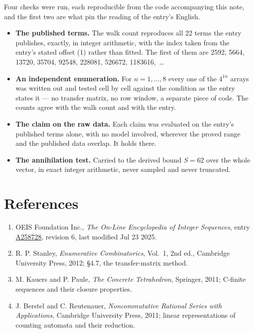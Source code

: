 \documentclass[11pt]{article}
\theoremstyle{definition}
\begin{document}
Four checks were run, each reproducible from the code accompanying this note, and the first two are what pin the reading of the entry's English.

\begin{itemize}

\item {\bfseries The published terms.} The walk count reproduces all 22 terms the entry publishes, exactly, in integer arithmetic, with the index taken from the entry's stated offset (1) rather than fitted. The first of them are 2592, 5664, 13720, 35704, 92548, 228081, 526672, 1183616,~\dots

\item {\bfseries An independent enumeration.} For $n = 1,\dots,8$ every one of the $4^{1n}$ arrays was written out and tested cell by cell against the condition as the entry states it --- no transfer matrix, no row window, a separate piece of code. The counts agree with the walk count and with the entry.

\item {\bfseries The claim on the raw data.} Each claim was evaluated on the entry's published terms alone, with no model involved, wherever the proved range and the published data overlap. It holds there.

\item {\bfseries The annihilation test.} Carried to the derived bound $S = 62$ over the whole vector, in exact integer arithmetic, never sampled and never truncated.

\end{itemize}

\section{References}

\begin{enumerate}

\item OEIS Foundation Inc., \emph{The On-Line Encyclopedia of Integer Sequences}, entry \href{https://oeis.org/A258728}{A258728}, revision 6, last modified Jul 23 2025.

\item R. P. Stanley, \emph{Enumerative Combinatorics}, Vol.~1, 2nd ed., Cambridge University Press, 2012; \S4.7, the transfer-matrix method.

\item M. Kauers and P. Paule, \emph{The Concrete Tetrahedron}, Springer, 2011; C-finite sequences and their closure properties.

\item J. Berstel and C. Reutenauer, \emph{Noncommutative Rational Series with Applications}, Cambridge University Press, 2011; linear representations of counting automata and their reduction.

\end{enumerate}
\end{document}
